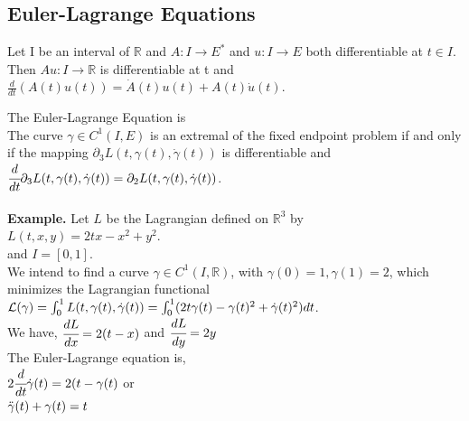 \documentclass[12 pt]{article}
\theoremstyle{definition}
\theoremstyle{remark}
\newcommand{\R}{\mathbb{R}}
\begin{document}
{\subsection{Euler-Lagrange Equations}
\proposition Let I be an interval of $\R$ and $A : I \to E^*$ and $u : I \to E$ both differentiable at $t \in I$. Then $Au : I \to \R$ is differentiable at t and\\
\hspace*{3cm} $\frac{d}{dt}(A(t)u(t)) = \dot{A}(t)u(t) + A(t)\dot{u}(t)$.


\newpage
\normalfont The Euler-Lagrange Equation is\\
\theorem The curve $\gamma \in C^1(I,E)$ is an extremal of the fixed endpoint problem if and only if the mapping $\partial_3 L(t, \gamma(t), \dot{\gamma} (t))$ is differentiable and \\

\hspace*{3cm} $\cfrac{d}{dt}\partial_3 L(t, \gamma(t), \dot{\gamma} (t)) = \partial_2 L(t, \gamma(t), \dot{\gamma} (t))$.\\~\\
\normalfont
\textbf{Example.} Let $L$ be the Lagrangian defined on $\R^3$ by \\
\hspace*{3cm} $L(t,x,y) = 2tx - x^2 + y^2$.\\
and $I=[0,1]$.\\

We intend to find a curve $\gamma \in C^1(I,\R)$, with $\gamma (0) =1, \gamma (1) = 2$, which minimizes the Lagrangian functional\\

\hspace*{3cm} $\mathcal{L}(\gamma) = \int_0^1 L (t, \gamma(t), \dot{\gamma}(t)) = \int_0^1 (2t\gamma(t) - \gamma(t)^2 + \dot{\gamma}(t)^2)dt$.\\

We have, $\cfrac{dL}{dx} = 2(t-x)$ and $\cfrac{dL}{dy} = 2y$\\

The Euler-Lagrange equation is,\\

\hspace*{3cm} $2\cfrac{d}{dt}\dot{\gamma}(t) = 2 (t - \gamma(t)$ or\\

\hspace*{3cm} $\Ddot{\gamma}(t) + \gamma(t) = t$\\

}
\end{document}
